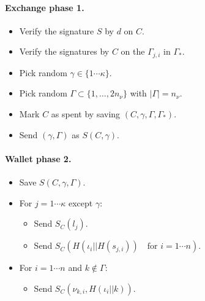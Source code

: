 \documentclass{llncs}
\begin{document}
\paragraph{Exchange phase 1.}
\begin{itemize}
\item  Verify the signature $S$ by $d$ on $C$.
\item  Verify the signatures by $C$ on the $\Gamma_{j,i}$ in $\Gamma_*$.
\item  Pick random $\gamma \in \{1 \cdots \kappa\}$.
\item  Pick random $\Gamma \subset \{1,\ldots,2 n_\nu\}$ with $|\Gamma| = n_\nu$.
\item  Mark $C$ as spent by saving $(C,\gamma,\Gamma,\Gamma_*)$.
\item  Send $(\gamma,\Gamma)$ as $S(C,\gamma)$.
\end{itemize}

\paragraph{Wallet phase 2.}
\begin{itemize}
\item  Save $S(C,\gamma,\Gamma)$.
\item  For $j = 1 \cdots \kappa$ except $\gamma$:
   \begin{itemize}
   \item  Send $S_C(l_j)$.
   \item  Send $S_C(H(\iota_i || H(s_{j,i})) \quad\textrm{for $i = 1 \cdots n$})$.   
   \end{itemize}
\item  For $i = 1 \cdots n$ and $k \not\in \Gamma$:
   \begin{itemize}
   \item  Send $S_C( \nu_{k,i}, H(\iota_i || k) )$.
   \end{itemize}
\end{itemize}
\end{document}
